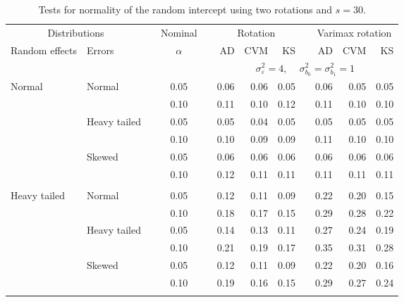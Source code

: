\begin{table}[ht]
\caption{\label{tab:simb030}Tests for normality of the random intercept using two rotations and $s = 30$.}
\begin{scriptsize}
\begin{center}
\begin{tabular}{ll p{.1cm} c p{.1cm} rrr p{.1cm} rrr}
  \hline
  \multicolumn{2}{c}{Distributions}& & Nominal & &  \multicolumn{3}{c}{Rotation} & & \multicolumn{3}{c}{Varimax rotation} \\ \cline{1-2} \cline{6-8} \cline{10-12}   
  Random effects & Errors & & $\alpha$ & & AD & CVM & KS & & AD & CVM & KS \\ 
   \hline
& && && \multicolumn{7}{c}{$\sigma_{\varepsilon}^2 = 4$, \ \ $\sigma_{b_0}^2 = \sigma_{b_1}^2 = 1$} \\ \cline{6-12}
\rowcolor{gray!20}Normal       & Normal       && 0.05 &&  0.06 & 0.06 & 0.05 && 0.06 & 0.05 & 0.05 \\ 
\rowcolor{gray!20}             &              && 0.10 &&  0.11 & 0.10 & 0.12 && 0.11 & 0.10 & 0.10 \\ 
\rowcolor{gray!20}             & Heavy tailed && 0.05 &&  0.05 & 0.04 & 0.05 && 0.05 & 0.05 & 0.05 \\ 
\rowcolor{gray!20}             &              && 0.10 &&  0.10 & 0.09 & 0.09 && 0.11 & 0.10 & 0.10 \\ 
\rowcolor{gray!20}             & Skewed       && 0.05 &&  0.06 & 0.06 & 0.06 && 0.06 & 0.06 & 0.06 \\ 
\rowcolor{gray!20}             &              && 0.10 &&  0.12 & 0.11 & 0.11 && 0.11 & 0.11 & 0.11 \\ 
             &&&&&&&&&&&\\
Heavy tailed & Normal       && 0.05 &&  0.12 & 0.11 & 0.09 && 0.22 & 0.20 & 0.15 \\ 
             &              && 0.10 &&  0.18 & 0.17 & 0.15 && 0.29 & 0.28 & 0.22 \\ 
             & Heavy tailed && 0.05 &&  0.14 & 0.13 & 0.11 && 0.27 & 0.24 & 0.19 \\ 
             &              && 0.10 &&  0.21 & 0.19 & 0.17 && 0.35 & 0.31 & 0.28 \\ 
             & Skewed       && 0.05 &&  0.12 & 0.11 & 0.09 && 0.22 & 0.20 & 0.16 \\ 
             &              && 0.10 &&  0.19 & 0.16 & 0.15 && 0.29 & 0.27 & 0.24 \\ 
             &&&&&&&&&&&\\

\end{tabular}
\end{center}
\end{scriptsize}
\end{table}
